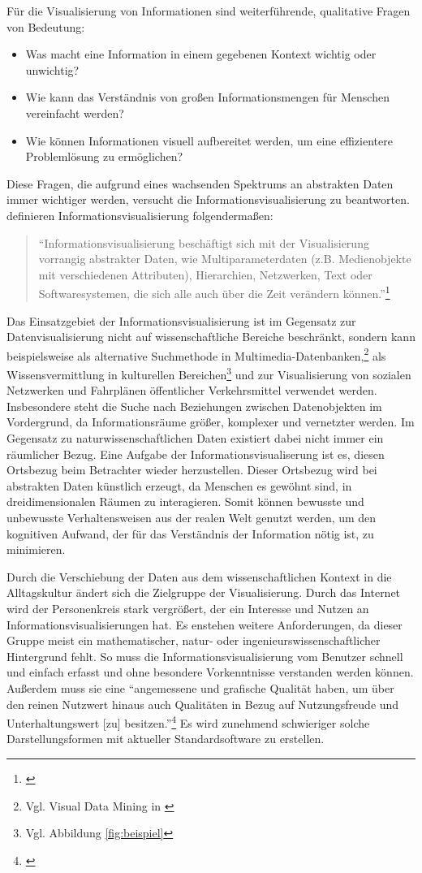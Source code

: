 \documentclass[a4paper, 
               12pt,
               DIV=calc,
               version=first,
               pdftex,
               headsepline,
               footsepline,
               bibtotocnumbered,
               liststotocnumbered]{scrreprt}
\begin{document}
Für die Visualisierung von Informationen sind weiterführende, qualitative Fragen von Bedeutung:
\begin{itemize}
\item Was macht eine Information in einem gegebenen Kontext wichtig oder unwichtig?
\item Wie kann das Verständnis von großen Informationsmengen für Menschen vereinfacht werden?
\item Wie können Informationen visuell aufbereitet werden, um eine effizientere Problemlösung zu ermöglichen?
\end{itemize}
Diese Fragen, die aufgrund eines wachsenden Spektrums an abstrakten Daten immer wichtiger werden,
versucht die Informationsvisualisierung zu beantworten.
\cite{Preim} definieren Informationsvisualisierung folgendermaßen:
\begin{quote}
"`Informationsvisualisierung beschäftigt sich mit der Visualisierung vorrangig abstrakter Daten, wie
Multiparameterdaten (z.B. Medienobjekte mit verschiedenen Attributen), Hierarchien, Netzwerken, Text
oder Softwaresystemen, die sich alle auch über die Zeit verändern können."'\footnote{\citep[S.\,434]{Preim}}
\end{quote}
Das Einsatzgebiet der Informationsvisualisierung ist im Gegensatz zur Datenvisualisierung nicht
auf wissenschaftliche Bereiche beschränkt,
sondern kann beispielsweise als alternative Suchmethode in Multimedia-Datenbanken,\footnote{Vgl. Visual Data Mining in \citep{Keim}}
als Wissensvermittlung in kulturellen Bereichen\footnote{Vgl. Abbildung \ref{fig:beispiel}} und zur Visualisierung von
sozialen Netzwerken und Fahrplänen öffentlicher Verkehrsmittel verwendet werden.
Insbesondere steht die Suche nach Beziehungen zwischen Datenobjekten im Vordergrund,
da Informationsräume größer, komplexer und vernetzter werden. Im Gegensatz
zu naturwissenschaftlichen Daten existiert dabei nicht immer ein räumlicher Bezug.
Eine Aufgabe der Informationsvisualiserung ist es, diesen Ortsbezug beim Betrachter wieder herzustellen.
Dieser Ortsbezug wird bei abstrakten Daten künstlich erzeugt, da
Menschen es gewöhnt sind, in dreidimensionalen Räumen zu interagieren.
Somit können bewusste und unbewusste Verhaltensweisen aus der realen Welt genutzt werden, um den
kognitiven Aufwand, der für das Verständnis der Information nötig ist, zu minimieren.

Durch die Verschiebung der Daten aus dem wissenschaftlichen Kontext
in die Alltagskultur ändert sich die Zielgruppe der Visualisierung. Durch das Internet
wird der Personenkreis stark vergrößert, der ein Interesse und Nutzen an Informationsvisualisierungen
hat. Es enstehen weitere Anforderungen, da dieser Gruppe meist ein mathematischer, natur- oder ingenieurswissenschaftlicher Hintergrund
fehlt. So muss die Informationsvisualisierung vom Benutzer
schnell und einfach erfasst und ohne besondere Vorkenntnisse verstanden werden können.
Außerdem muss sie eine "`angemessene und grafische Qualität haben, um über den
reinen Nutzwert hinaus auch Qualitäten in Bezug auf Nutzungsfreude und Unterhaltungswert [zu] besitzen."'\footnote{\citep[S.\,438]{Preim}}
Es wird zunehmend schwieriger solche Darstellungsformen mit aktueller Standardsoftware zu erstellen.
\end{document}
